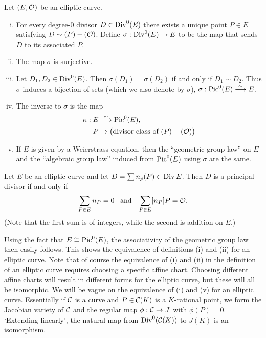 \begin{prop}
Let $(E, \mathcal{O})$ be an elliptic curve. \leavevmode\vspace{-1em}
        \begin{enumerate}[(i)] \itemsep-1em
        \item For every degree-0 divisor $D \in \operatorname{Div}^0(E)$ there exists a unique point $P \in E$ satisfying $D \sim (P) - (\mathcal{O})$. Define $\sigma: \operatorname{Div}^0(E) \to E$ to be the map that sends $D$ to its associated $P$.
        \item The map $\sigma$ is surjective.
        \item Let $D_1, D_2 \in \operatorname{Div}^0(E)$. Then $\sigma(D_1)= \sigma(D_2)$ if and only if $D_1 \sim D_2$. Thus $\sigma$ induces a bijection of sets (which we also denote by $\sigma$), $\sigma: \operatorname{Pic}^0(E) \stackrel{\sim}{\longrightarrow} E$. 
        \item The inverse to $\sigma$ is the map
        	\[
	\begin{aligned}
        	\kappa: E &\stackrel{\sim}{\longrightarrow} \operatorname{Pic}^0(E), \\
	P &\mapsto \big(\text{divisor class of } (P) - (\mathcal{O}) \big)
	\end{aligned}
        	\]
        \item If $E$ is given by a Weierstrass equation, then the ``geometric group law'' on $E$ and the ``algebraic group law'' induced from $\operatorname{Pic}^0(E)$ using $\sigma$ are the same. 
        \end{enumerate}
\end{prop}


\begin{cor}
Let $E$ be an elliptic curve and let $D= \sum n_p(P) \in \operatorname{Div} E$. Then $D$ is a principal divisor if and only if
	\[
	\sum_{P \in E} n_P= 0 \enskip\text{ and }\enskip \sum_{P \in E} [n_P]P= \mathcal{O}.
	\]
(Note that the first sum is of integers, while the second is addition on $E$.)
\end{cor}


Using the fact that $E \cong \operatorname{Pic}^0(E)$, the associativity of the geometric group law then easily follows. This shows the equivalence of definitions (i) and (ii) for an elliptic curve. Note that of course the equivalence of (i) and (ii) in the definition of an elliptic curve requires choosing a specific affine chart. Choosing different affine charts will result in different forms for the elliptic curve, but these will all be isomorphic. We will be vague on the equivalence of (i) and (v) for an elliptic curve. Essentially if $\mathcal{C}$ is a curve and $P \in \mathcal{C}(K)$ is a $K$-rational point, we form the Jacobian variety of $\mathcal{C}$ and the regular map $\phi: \mathcal{C} \to J$ with $\phi(P)= 0$. `Extending linearly', the natural map from $\operatorname{Div}^0(\mathcal{C}(K))$ to $J(K)$ is an isomorphism. 

